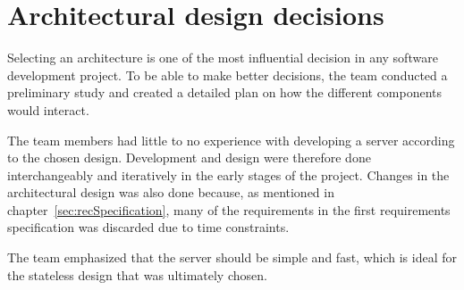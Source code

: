 \section{Architectural design decisions}
Selecting an architecture is one of the most influential decision in any software development project. To be able to make better decisions, the team conducted a preliminary study and created a detailed plan on how the different components would interact. 

The team members had little to no experience with developing a server according to the chosen design. Development and design were therefore done interchangeably and iteratively in the early stages of the project. Changes in the architectural design was also done because, as mentioned in chapter~\ref{sec:recSpecification}, many of the requirements in the first requirements specification was discarded due to time constraints.

The team emphasized that the server should be simple and fast, which is ideal for the stateless design that was ultimately chosen.